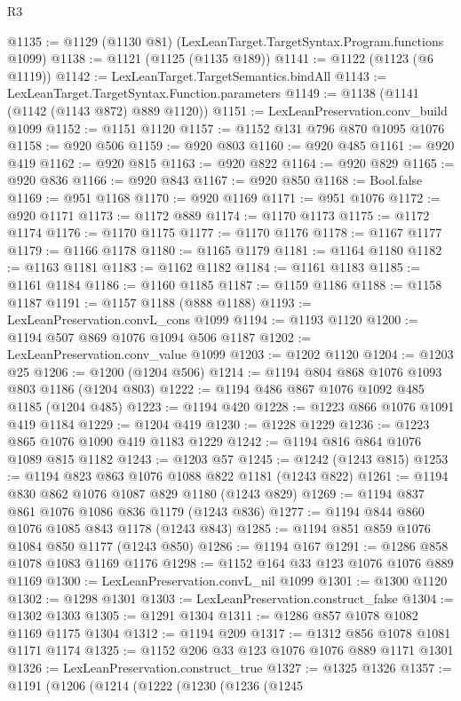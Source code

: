 \begin{lexlean}{R3}
\begin{coremodule}
@1135 := @1129 (@1130 @81) (LexLeanTarget.TargetSyntax.Program.functions @1099)
@1138 := @1121 (@1125 (@1135 @189))
@1141 := @1122 (@1123 (@6 @1119))
@1142 := LexLeanTarget.TargetSemantics.bindAll
@1143 := LexLeanTarget.TargetSyntax.Function.parameters
@1149 := @1138 (@1141 (@1142 (@1143 @872) @889 @1120))
@1151 := LexLeanPreservation.conv_build @1099
@1152 := @1151 @1120
@1157 := @1152 @131 @796 @870 @1095 @1076
@1158 := @920 @506
@1159 := @920 @803
@1160 := @920 @485
@1161 := @920 @419
@1162 := @920 @815
@1163 := @920 @822
@1164 := @920 @829
@1165 := @920 @836
@1166 := @920 @843
@1167 := @920 @850
@1168 := Bool.false
@1169 := @951 @1168
@1170 := @920 @1169
@1171 := @951 @1076
@1172 := @920 @1171
@1173 := @1172 @889
@1174 := @1170 @1173
@1175 := @1172 @1174
@1176 := @1170 @1175
@1177 := @1170 @1176
@1178 := @1167 @1177
@1179 := @1166 @1178
@1180 := @1165 @1179
@1181 := @1164 @1180
@1182 := @1163 @1181
@1183 := @1162 @1182
@1184 := @1161 @1183
@1185 := @1161 @1184
@1186 := @1160 @1185
@1187 := @1159 @1186
@1188 := @1158 @1187
@1191 := @1157 @1188 (@888 @1188)
@1193 := LexLeanPreservation.convL_cons @1099
@1194 := @1193 @1120
@1200 := @1194 @507 @869 @1076 @1094 @506 @1187
@1202 := LexLeanPreservation.conv_value @1099
@1203 := @1202 @1120
@1204 := @1203 @25
@1206 := @1200 (@1204 @506)
@1214 := @1194 @804 @868 @1076 @1093 @803 @1186 (@1204 @803)
@1222 := @1194 @486 @867 @1076 @1092 @485 @1185 (@1204 @485)
@1223 := @1194 @420
@1228 := @1223 @866 @1076 @1091 @419 @1184
@1229 := @1204 @419
@1230 := @1228 @1229
@1236 := @1223 @865 @1076 @1090 @419 @1183 @1229
@1242 := @1194 @816 @864 @1076 @1089 @815 @1182
@1243 := @1203 @57
@1245 := @1242 (@1243 @815)
@1253 := @1194 @823 @863 @1076 @1088 @822 @1181 (@1243 @822)
@1261 := @1194 @830 @862 @1076 @1087 @829 @1180 (@1243 @829)
@1269 := @1194 @837 @861 @1076 @1086 @836 @1179 (@1243 @836)
@1277 := @1194 @844 @860 @1076 @1085 @843 @1178 (@1243 @843)
@1285 := @1194 @851 @859 @1076 @1084 @850 @1177 (@1243 @850)
@1286 := @1194 @167
@1291 := @1286 @858 @1078 @1083 @1169 @1176
@1298 := @1152 @164 @33 @123 @1076 @1076 @889 @1169
@1300 := LexLeanPreservation.convL_nil @1099
@1301 := @1300 @1120
@1302 := @1298 @1301
@1303 := LexLeanPreservation.construct_false
@1304 := @1302 @1303
@1305 := @1291 @1304
@1311 := @1286 @857 @1078 @1082 @1169 @1175 @1304
@1312 := @1194 @209
@1317 := @1312 @856 @1078 @1081 @1171 @1174
@1325 := @1152 @206 @33 @123 @1076 @1076 @889 @1171 @1301
@1326 := LexLeanPreservation.construct_true
@1327 := @1325 @1326
@1357 := @1191
    (@1206
      (@1214
        (@1222
          (@1230
            (@1236
              (@1245

\end{coremodule}
\end{lexlean}
